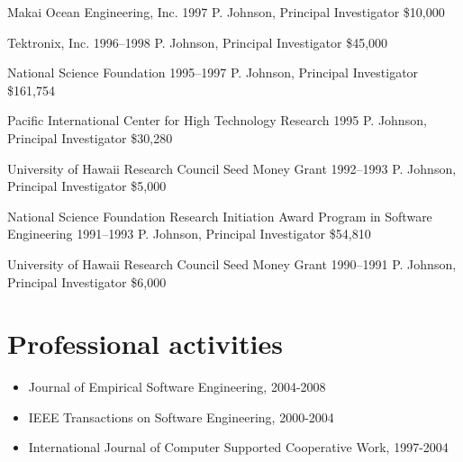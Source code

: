 \documentclass[11pt,letterpaper,sans]{moderncv} %
\begin{document}
        {Makai Ocean Engineering, Inc.} %
        {1997} %
        {P. Johnson, Principal Investigator}  %
        {\$10,000} %

        {Tektronix, Inc.} %
        {1996--1998} %
        {P. Johnson, Principal Investigator}  %
        {\$45,000} %

        {National Science Foundation} %
        {1995--1997} %
        {P. Johnson, Principal Investigator}  %
        {\$161,754} %

        {Pacific International Center for High Technology Research} %
        {1995} %
        {P. Johnson, Principal Investigator}  %
        {\$30,280} %

        {University of Hawaii Research Council Seed Money Grant} %
        {1992--1993} %
        {P. Johnson, Principal Investigator}  %
        {\$5,000} %

        {National Science Foundation Research Initiation Award Program in Software Engineering} %
        {1991--1993} %
        {P. Johnson, Principal Investigator}  %
        {\$54,810} %

        {University of Hawaii Research Council Seed Money Grant} %
        {1990--1991} %
        {P. Johnson, Principal Investigator}  %
        {\$6,000} %


\section{Professional activities}

\begin{itemize}
\item Journal of Empirical Software Engineering, 2004-2008
\item IEEE Transactions on Software Engineering, 2000-2004
\item International Journal of Computer Supported Cooperative Work, 1997-2004
\end{itemize}
\end{document}
